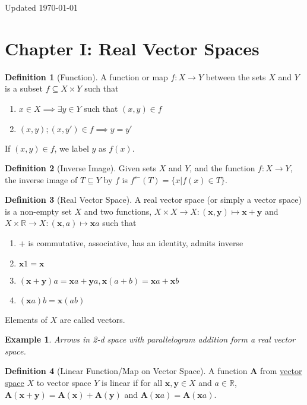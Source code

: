 \documentclass[letterpaper,12pt]{article}
\theoremstyle{plain}
\theoremstyle{plain}
\newtheorem{exmp}{Example}
\theoremstyle{definition}
\newtheorem{defn}{Definition}
\begin{document}
\hfill Updated \today
\section{Chapter I: Real Vector Spaces}
\begin{defn}[Function]\label{deffn}
A function or map $f:X\rightarrow Y$ between the sets  $X$ and $Y$ is a subset $f\subseteq X\times Y$ such that
\begin{enumerate}
\item $x\in X \implies \exists y\in Y$ such that $(x,y)\in f$
\item $(x,y);(x,y')\in f \implies y=y'$
\end{enumerate}
If $(x,y)\in f$, we label $y$ as $f(x)$.
\end{defn}

\begin{defn}[Inverse Image]\label{definvi}
Given sets  $X$ and $Y$, and the function $f:X\rightarrow Y$, the inverse image of $T\subseteq Y$ by $f$ is $f^{\leftarrow}(T)=\{x|f(x)\in T\}$.
\end{defn}

\begin{defn}[Real Vector Space]\label{defrvs}
A real vector space (or simply a vector space) is a non-empty set $X$ and two functions, $X\times X \rightarrow X:(\mathbf{x},\mathbf{y})\mapsto \mathbf{x}+\mathbf{y}$ and $X\times \mathbb{R} \rightarrow X:(\mathbf{x},a)\mapsto \mathbf{x}a$ such that
\begin{enumerate}
\item + is commutative, associative, has an identity, admits inverse
\item $\mathbf{x}1=\mathbf{x}$
\item $(\mathbf{x}+\mathbf{y})a=\mathbf{x}a+\mathbf{y}a, \mathbf{x}(a+b)=\mathbf{x}a+\mathbf{x}b$
\item $(\mathbf{x}a)b=\mathbf{x}(ab)$
\end{enumerate}
Elements of $X$ are called vectors.
\end{defn}
\begin{exmp} Arrows in 2-d space with parallelogram addition form a real vector space.
\end{exmp}

\begin{defn}[Linear Function/Map on Vector Space]\label{deflinfvs}
A function $\mathbf{A}$ from \hyperref[defrvs]{vector space} $X$ to vector space $Y$ is linear if for all $\mathbf{x},\mathbf{y}\in X$ and $a\in \mathbb{R}$, $\mathbf{A}(\mathbf{x}+\mathbf{y})=\mathbf{A}(\mathbf{x})+\mathbf{A}(\mathbf{y})$ and $\mathbf{A}(\mathbf{x}a)=\mathbf{A}(\mathbf{x}a)$.
\end{defn}
\end{document}
